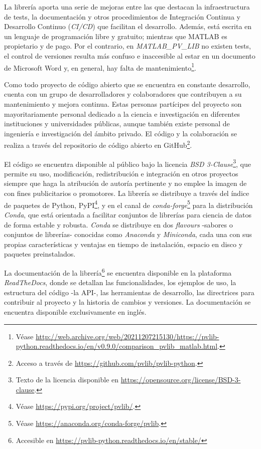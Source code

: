 La librería \pvlibpy{} aporta una serie de mejoras entre las que destacan la infraestructura de tests, la documentación y otros procedimientos de Integración Continua y Desarrollo Continuo (\textit{CI/CD}) que facilitan el desarrollo. Además, está escrita en un lenguaje de programación libre y gratuito; mientras que \gls{MATLAB} es propietario y de pago. Por el contrario, en \textit{MATLAB\_PV\_LIB} no existen tests, el control de versiones resulta más confuso e inaccesible al estar en un documento de Microsoft Word y, en general, hay falta de mantenimiento\footnote{Véase \url{http://web.archive.org/web/20211207215130/https://pvlib-python.readthedocs.io/en/v0.9.0/comparison_pvlib_matlab.html}.}.

Como todo proyecto de código abierto que se encuentra en constante desarrollo, \pvlibpy{} cuenta con un grupo de desarrolladores y colaboradores que contribuyen a su mantenimiento y mejora continua. Estas personas partícipes del proyecto son mayoritariamente personal dedicado a la ciencia e investigación en diferentes instituciones y universidades públicas, aunque también existe personal de ingeniería e investigación del ámbito privado. El código y la colaboración se realiza a través del repositorio de código abierto en GitHub\footnote{Acceso a través de \url{https://github.com/pvlib/pvlib-python}.}.

El código se encuentra disponible al público bajo la \gls{licencia} \textit{BSD 3-Clause}\footnote{Texto de la licencia disponible en \url{https://opensource.org/license/BSD-3-clause}.}, que permite su uso, modificación, redistribución e integración en otros proyectos siempre que haga la atribución de autoría pertinente y no emplee la imagen de \pvlibpy{} con fines publicitarios o promotores. La librería se distribuye a través del índice de paquetes de Python, PyPI\footnote{Véase \url{https://pypi.org/project/pvlib/}.}, y en el canal de \textit{conda-forge}\footnote{Véase \url{https://anaconda.org/conda-forge/pvlib}.} para la distribución \textit{Conda}, que está orientada a facilitar conjuntos de librerías para ciencia de datos de forma estable y robusta. \textit{Conda} se distribuye en dos \textit{flavours} -sabores o conjuntos de librerías- conocidas como \textit{Anaconda} y \textit{Miniconda}, cada una con sus propias características y ventajas en tiempo de instalación, espacio en disco y paquetes preinstalados.

La \gls{documentación} de la librería\footnote{Accesible en \url{https://pvlib-python.readthedocs.io/en/stable/}} se encuentra disponible en la plataforma\\ \mbox{\textit{ReadTheDocs}}, donde se detallan las funcionalidades, los ejemplos de uso, la estructura del código -la \gls{API}-, las herramientas de desarrollo, las directrices para contribuir al proyecto y la historia de cambios y versiones. La documentación se encuentra disponible exclusivamente en inglés.

